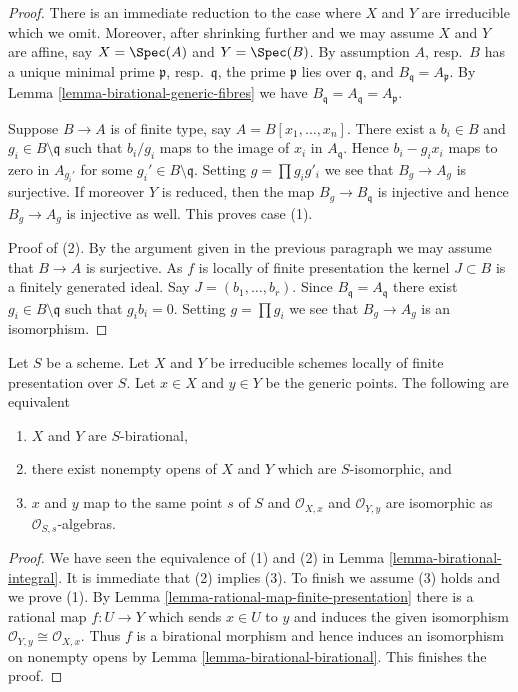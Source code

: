 \begin{proof}
There is an immediate reduction to the case where $X$ and $Y$ are irreducible
which we omit. Moreover, after shrinking further and we may assume $X$ and
$Y$ are affine, say $X = \Spec(A)$ and $Y = \Spec(B)$.
By assumption $A$, resp.\ $B$ has a unique minimal prime $\mathfrak p$,
resp.\ $\mathfrak q$, the prime $\mathfrak p$ lies over $\mathfrak q$, and
$B_\mathfrak q = A_\mathfrak p$.
By Lemma \ref{lemma-birational-generic-fibres} we have
$B_\mathfrak q = A_\mathfrak q = A_\mathfrak p$.

\medskip\noindent
Suppose $B \to A$ is of finite type, say $A = B[x_1, \ldots, x_n]$.
There exist a $b_i \in B$ and $g_i \in B \setminus \mathfrak q$
such that $b_i/g_i$ maps to the image of $x_i$ in $A_\mathfrak q$.
Hence $b_i  - g_ix_i$ maps to zero in $A_{g_i'}$ for some
$g_i' \in B \setminus \mathfrak q$. Setting $g = \prod g_i g'_i$
we see that $B_g \to A_g$ is surjective. If moreover $Y$ is reduced,
then the map $B_g \to B_\mathfrak q$ is injective and hence
$B_g \to A_g$ is injective as well. This proves case (1).

\medskip\noindent
Proof of (2). By the argument given in the previous paragraph we may
assume that $B \to A$ is surjective. As $f$ is locally of finite presentation
the kernel $J \subset B$ is a finitely generated ideal. Say
$J = (b_1, \ldots, b_r)$. Since $B_\mathfrak q = A_\mathfrak q$
there exist $g_i \in B \setminus \mathfrak q$ such that
$g_i b_i = 0$. Setting $g = \prod g_i$ we see that $B_g \to A_g$
is an isomorphism.
\end{proof}

\begin{lemma}
\label{lemma-criterion-birational-finite-presentation}
Let $S$ be a scheme. Let $X$ and $Y$ be irreducible schemes
locally of finite presentation over $S$. Let $x \in X$ and $y \in Y$
be the generic points. The following are equivalent
\begin{enumerate}
\item $X$ and $Y$ are $S$-birational,
\item there exist nonempty opens of $X$ and $Y$
which are $S$-isomorphic, and
\item $x$ and $y$ map to the same point $s$ of $S$ and
$\mathcal{O}_{X, x}$ and $\mathcal{O}_{Y, y}$ are isomorphic as
$\mathcal{O}_{S, s}$-algebras.
\end{enumerate}
\end{lemma}

\begin{proof}
We have seen the equivalence of (1) and (2) in
Lemma \ref{lemma-birational-integral}.
It is immediate that (2) implies (3).
To finish we assume (3) holds and we prove (1).
By Lemma \ref{lemma-rational-map-finite-presentation}
there is a rational map $f : U \to Y$
which sends $x \in U$ to $y$ and induces
the given isomorphism $\mathcal{O}_{Y, y} \cong \mathcal{O}_{X, x}$.
Thus $f$ is a birational morphism and hence induces
an isomorphism on nonempty opens
by Lemma \ref{lemma-birational-birational}.
This finishes the proof.
\end{proof}

